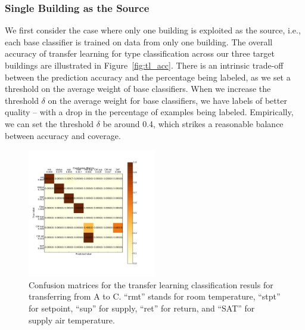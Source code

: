 \subsubsection{Single Building as the Source}
We first consider the case where only one building is exploited as the source, i.e., each base classifier is trained on data from only one building. 
The overall accuracy of transfer learning for type classification across our three target buildings are illustrated in Figure~\ref{fig:tl_acc}.
There is an intrinsic trade-off between the prediction accuracy and the percentage being labeled, as we set a threshold on the average weight of base classifiers. 
When we increase the threshold $\delta$ on the average weight for base classifiers, we have labels of better quality -- with a drop in the percentage of examples being labeled. 
Empirically, we can set the threshold $\delta$ be around 0.4, which strikes a reasonable balance between accuracy and coverage.

\begin{figure}[ht!]
                \centering
    \includegraphics[width=0.5\textwidth]{./fig/cm_single}
\caption{Confusion matrices for the transfer learning classification resuls for transferring from A to C. ``rmt'' stands for room temperature, ``stpt'' for setpoint, ``sup'' for supply, ``ret'' for return, and ``SAT'' for supply air temperature.
 }
\label{fig_cm}
\end{figure}

